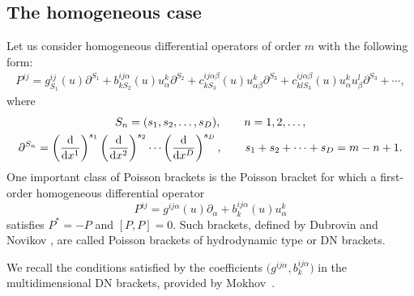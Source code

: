 \documentclass[pdftex]{sigma}
\numberwithin{equation}{section}
\begin{document}
\subsection{The homogeneous case}
Let us consider homogeneous differential operators of order $m$ with the following form:
\begin{gather*}
P^{ij}=g^{ij}_{S_1}(u)\partial^{S_1}+b^{ij\alpha}_{kS_2}(u) u^k_\alpha\partial^{S_2}+c^{ij\alpha\beta}_{kS_3}(u)u^k_{\alpha\beta}\partial^{S_3}+c^{ij\alpha\beta}_{klS_3}(u)u^k_\alpha u^l_\beta \partial^{S_3}+\cdots,
\end{gather*}
where
\begin{gather*}
S_n=(s_1,s_2,\dots,s_D) , \qquad n=1,2,\dots,
\\
\partial ^{S_n}=\left(\frac{\rm d}{{\rm d}x^1}\right)^{s_1}\left(\frac{\rm d}{{\rm d}x^2}\right)^{s_2}\cdots \left(\frac{\rm d}{{\rm d}x^D}\right)^{s_D} , \qquad s_1+s_2+\dots+s_D=m-n+1.
\end{gather*}
One important class of Poisson brackets is the Poisson bracket for which a first-order homogeneous differential operator
\begin{equation}\label{OP}
P^{ij}=g^{ij\alpha}(u)\partial_\alpha +b^{ij\alpha}_k(u)u^k_\alpha
 \end{equation}
satisfies $P^* =-P$ and $[P,P]=0$. Such brackets, defined by Dubrovin and Novikov \cite{dubrovin1996hamiltonian}, are called Poisson brackets of hydrodynamic type or DN brackets.

We recall the conditions satisfied by the coefficients $\big(g^{ij\alpha},b^{ij\alpha}_k\big)$ in the multidimensional DN brackets, provided by Mokhov~\cite{mokhov1988poisson}.
\end{document}
